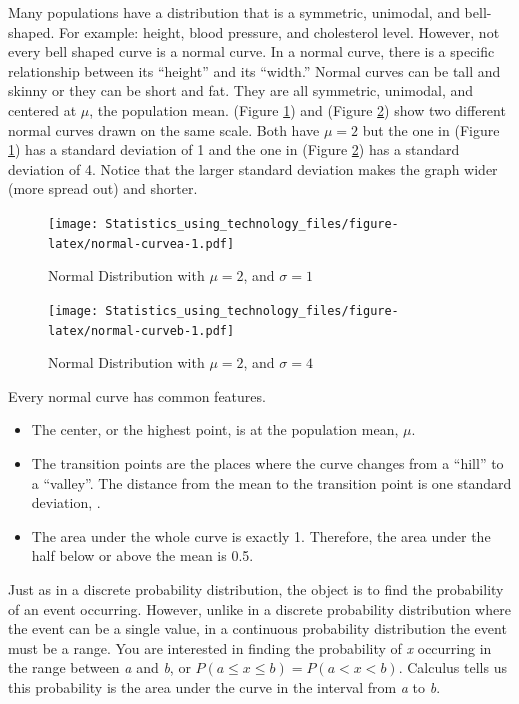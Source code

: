 \documentclass[]{book}
\providecommand{\tightlist}{%
  \setlength{\itemsep}{0pt}\setlength{\parskip}{0pt}}
\begin{document}
Many populations have a distribution that is a symmetric, unimodal, and bell-shaped. For example: height, blood pressure, and cholesterol level. However, not every bell shaped curve is a normal curve. In a normal curve, there is a specific relationship between its ``height'' and its ``width.''
Normal curves can be tall and skinny or they can be short and fat. They are all symmetric, unimodal, and centered at \(\mu\), the population mean. (Figure \ref{fig:normal-curvea}) and (Figure \ref{fig:normal-curveb}) show two different normal curves drawn on the same scale. Both have \(\mu=2\) but the one in (Figure \ref{fig:normal-curvea}) has a standard deviation of 1 and the one in (Figure \ref{fig:normal-curveb}) has a standard deviation of 4. Notice that the larger standard deviation makes the graph wider (more spread out) and shorter.



\begin{figure}
\centering
\texttt{[image: Statistics\_using\_technology\_files/figure-latex/normal-curvea-1.pdf]}
\caption{\label{fig:normal-curvea}Normal Distribution with \(\mu=2\), and \(\sigma=1\)}
\end{figure}



\begin{figure}
\centering
\texttt{[image: Statistics\_using\_technology\_files/figure-latex/normal-curveb-1.pdf]}
\caption{\label{fig:normal-curveb}Normal Distribution with \(\mu = 2\), and \(\sigma = 4\)}
\end{figure}

Every normal curve has common features.

\begin{itemize}
\tightlist
\item
  The center, or the highest point, is at the population mean, \(\mu\).
\item
  The transition points are the places where the curve changes from a ``hill'' to a ``valley''. The distance from the mean to the transition point is one standard deviation, .
\item
  The area under the whole curve is exactly 1. Therefore, the area under the half below or above the mean is 0.5.
\end{itemize}

Just as in a discrete probability distribution, the object is to find the probability of an event occurring. However, unlike in a discrete probability distribution where the event can be a single value, in a continuous probability distribution the event must be a range. You are interested in finding the probability of \emph{x} occurring in the range between \emph{a} and \emph{b}, or \(P(a \le x \le b) = P(a<x<b)\). Calculus tells us this probability is the area under the curve in the interval from \emph{a} to \emph{b}.
\end{document}
